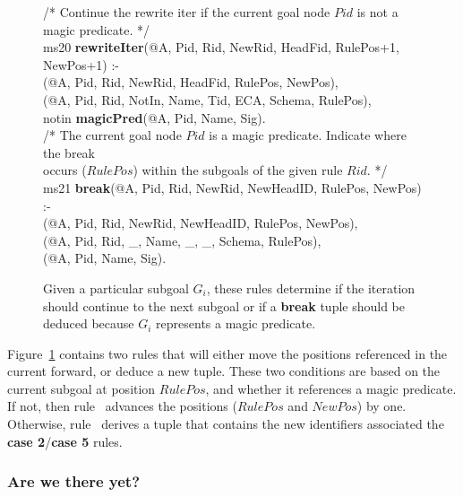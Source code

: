 \begin{figure}[!t]
\ssp
\centering
\begin{boxedminipage}{\linewidth}
/* Continue the rewrite iter if the current goal node $Pid$ is not a magic predicate. */ \\
ms20 {\bf rewriteIter}(@A, Pid, Rid, NewRid, HeadFid, RulePos+1, NewPos+1) :- \\
(@A, Pid, Rid, NewRid, HeadFid, RulePos, NewPos), \\
(@A, Pid, Rid, NotIn, Name, Tid, ECA, Schema, RulePos), \\
\datalogspace notin {\bf magicPred}(@A, Pid, Name, Sig). \\

/* The current goal node $Pid$ is a magic predicate. Indicate where the break \\
occurs ($RulePos$) within the subgoals of the given rule $Rid$. */ \\
ms21 {\bf break}(@A, Pid, Rid, NewRid, NewHeadID, RulePos, NewPos) :- \\
(@A, Pid, Rid, NewRid, NewHeadID, RulePos, NewPos), \\
(@A, Pid, Rid, \_, Name, \_, \_, Schema, RulePos), \\
(@A, Pid, Name, Sig).

\end{boxedminipage}
\caption{\label{ch:magic:fig:rewrite4} Given a particular subgoal $G_i$, these rules determine
if the iteration should continue to the next subgoal or if a {\bf break} tuple should be
deduced because $G_i$ represents a magic predicate. }
\end{figure}

Figure~\ref{ch:magic:fig:rewrite4} contains two rules that will either move the
positions referenced in the current  forward, or deduce a new
 tuple.  These two conditions are based on the current subgoal at
position $RulePos$, and whether it references a magic predicate.  If not, then
rule~ advances the  positions ($RulePos$ and $NewPos$)
by one.  Otherwise, rule~ derives a  tuple that contains the
new identifiers associated the {\bf case 2}/{\bf case 5} rules. 

\subsubsection{Are we there yet?}

